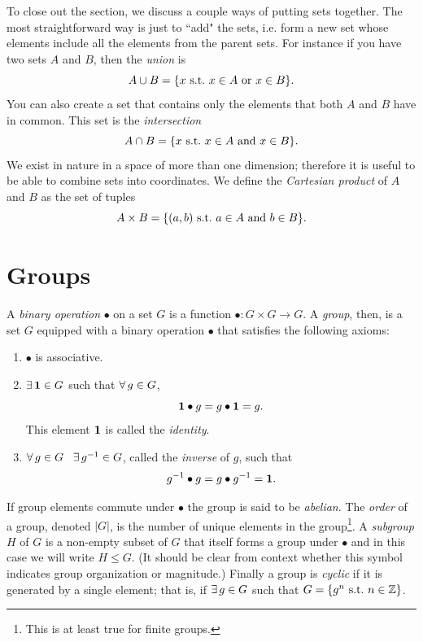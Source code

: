 To close out the section, we discuss a couple ways of putting sets together.
The most straightforward way is just to ``add" the sets, i.e. form a new set
whose elements include all the elements from the parent sets. For instance if
you have two sets $A$ and $B$, then the {\it union} is
\begin{equation}
A\cup B = \{x~\text{s.t.}~ x\in A~\text{or}~x\in B\}.
\end{equation}
You can also create a set that contains only the elements that both $A$ and $B$ have
in common. This set is the {\it intersection}
\begin{equation}
A\cap B = \{x~\text{s.t.}~ x\in A~\text{and}~x\in B\}.
\end{equation}
We exist in nature in a space of more than one dimension; therefore it is useful to be
able to combine sets into coordinates. We define the
{\it Cartesian product} of $A$ and $B$ as the set of tuples
\begin{equation}
A\times B=\{(a,b)~\text{s.t.}~ a\in A~\text{and}~b\in B\}.
\end{equation}


\section{Groups}\label{sec:gpprelim}


A {\it binary operation} $\bullet$ on a set 
$G$ is a function $\bullet : G\times G\to G$. A {\it group}, 
then, is a set $G$ equipped with a binary operation $\bullet$ that satisfies 
the following axioms:
  \begin{enumerate}
    \item $\bullet$ is associative.
    \item $\operatorname{\exists} {\mathbf 1} \in G$ such that $\operatorname{\forall} g \in G$, 
          \begin{equation}
            {\mathbf 1}\bullet g=g\bullet {\mathbf 1}=g. 
          \end{equation} This element ${\mathbf 1}$ is called the {\it identity}.
    \item $\operatorname{\forall} g \in G\ \ \operatorname{\exists} g^{-1} \in G$, called the 
          {\it inverse} of $g$, such that
          \begin{equation}
            g^{-1}\bullet g=g\bullet g^{-1}={\mathbf 1}.
          \end{equation}
  \end{enumerate}
If group elements commute under $\bullet$ the group is said to be 
{\it abelian}. The {\it order} of a group, 
denoted $|G|$, is the number of unique elements in the group\footnote{This
is at least true for finite groups.}. A {\it subgroup}
$H$ of $G$ is a non-empty subset of $G$ that itself forms a group under 
$\bullet$ and in this case we will write $H\leq G$. 
(It should be clear from context whether this symbol indicates group 
organization or magnitude.) Finally a group is {\it cyclic}
if it is generated by a single element; that is, if $\operatorname{\exists} g\in G$ such that 
$G=\{g^{n}~\text{s.t.}~ n\in\mathbb{Z}\}$.

